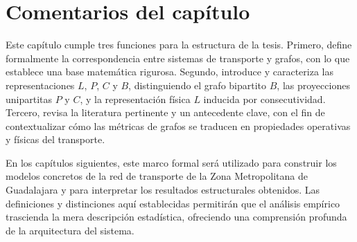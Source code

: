     \section{Comentarios del capítulo}

    Este capítulo cumple tres funciones para la estructura de la tesis. Primero, define formalmente la correspondencia entre sistemas de transporte y grafos, con lo que establece una base matemática rigurosa. Segundo, introduce y caracteriza las representaciones $L$, $P$, $C$ y $B$, distinguiendo el grafo bipartito $B$, las proyecciones unipartitas $P$ y $C$, y la representación física $L$ inducida por consecutividad. Tercero, revisa la literatura pertinente y un antecedente clave, con el fin de contextualizar cómo las métricas de grafos se traducen en propiedades operativas y físicas del transporte.

    En los capítulos siguientes, este marco formal será utilizado para construir los modelos concretos de la red de transporte de la Zona Metropolitana de Guadalajara y para interpretar los resultados estructurales obtenidos. Las definiciones y distinciones aquí establecidas permitirán que el análisis empírico trascienda la mera descripción estadística, ofreciendo una comprensión profunda de la arquitectura del sistema.
